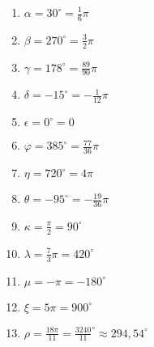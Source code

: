 \begin{Answer}[ref=bogenmassA1]
	\begin{enumerate}[label=\alph*)]
		\item \(\alpha=30^\circ=\frac{1}{6}\pi\)
		\item \(\beta=270^\circ=\frac{3}{2}\pi\)
		\item \(\gamma=178^\circ=\frac{89}{90}\pi\)
		\item \(\delta=-15^\circ=-\frac{1}{12}\pi\)
		\item \(\epsilon=0^\circ=0\)
		\item \(\varphi=385^\circ=\frac{77}{36}\pi\)
		\item \(\eta=720^\circ=4\pi\)
		\item \(\theta=-95^\circ=-\frac{19}{36}\pi\)
		\item \(\kappa=\frac{\pi}{2}=90^\circ\)
		\item \(\lambda=\frac{7}{3}\pi=420^\circ\)
		\item \(\mu=-\pi=-180^\circ\)
		\item \(\xi=5\pi=900^\circ\)
		\item \(\rho=\frac{18\pi}{11}=\frac{3240}{11}^\circ\approx294,54^\circ\)	
	\end{enumerate}
\end{Answer}